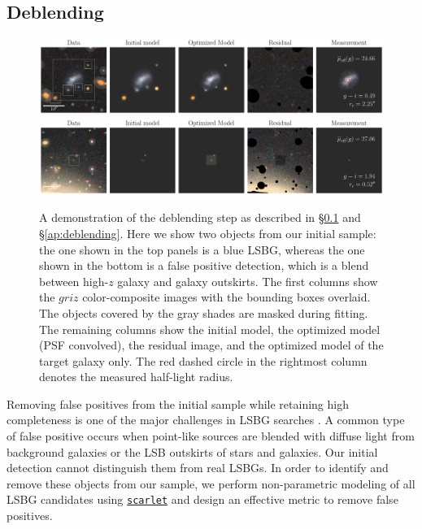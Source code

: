 \documentclass[twocolumn,astrosymb,twocolappendix,linenumbers]{aastex631}
\newcommand{\code}[1]{\texttt{#1}}
\begin{document}
\begin{CJK*}{UTF8}{gbsn}
\subsection{Deblending}\label{sec:deblending}

\begin{figure}
	\vbox{ 
		\centering
		\includegraphics[width=1\linewidth]{vanilla_scarlet_demo.pdf}
		\includegraphics[width=1\linewidth]{vanilla_scarlet_demo2.pdf}
	}
	\caption{A demonstration of the deblending step as described in \S\ref{sec:deblending} and \S\ref{ap:deblending}. Here we show two objects from our initial sample: the one shown in the top panels is a blue LSBG, whereas the one shown in the bottom is a false positive detection, which is a blend between high-$z$ galaxy and galaxy outskirts. The first columns show the $griz$ color-composite images with the bounding boxes overlaid. The objects covered by the gray shades are masked during fitting. The remaining columns show the initial model, the optimized model (PSF convolved), the residual image, and the optimized model of the target galaxy only. The red dashed circle in the rightmost column denotes the measured half-light radius.
	}
	\label{fig:vanilla_scarlet_demo}
\end{figure}

Removing false positives from the initial sample while retaining high completeness is one of the major challenges in LSBG searches \citep[e.g.,][]{vanDokkum2015,Koda2015,Yagi2016,Greco2018,SAGA-I,Zaritsky2019,Zaritsky2021,Tanoglidis2021,Zaritsky2022}. A common type of false positive occurs when point-like sources are blended with diffuse light from background galaxies or the LSB outskirts of stars and galaxies. Our initial detection cannot distinguish them from real LSBGs. In order to identify and remove these objects from our sample, we perform non-parametric modeling of all LSBG candidates using \href{https://pmelchior.github.io/scarlet/}{\code{scarlet}} \citep{Melchior2018} and design an effective metric to remove false positives.



\end{CJK*}
\end{document}
